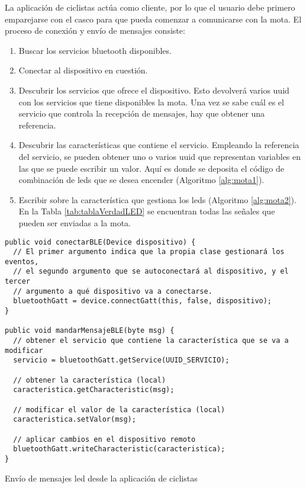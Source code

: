 La aplicación de ciclistas actúa como cliente, por lo que el usuario debe
primero emparejarse con el casco para que pueda comenzar a comunicarse con
la mota. El proceso de conexión y envío de mensajes consiste:
\begin{enumerate}
	\item Buscar los servicios bluetooth disponibles.

	\item Conectar al dispositivo en cuestión.

	\item Descubrir los servicios que ofrece el dispositivo. Esto devolverá
	varios \gls{uuid} con los servicios que tiene disponibles la mota. Una vez
	se sabe cuál es el servicio que controla la recepción de mensajes, hay que
	obtener	una referencia.

	\item Descubrir las características que contiene el servicio. Empleando la
	referencia del servicio, se pueden obtener uno o varios \gls{uuid} que
	representan variables en las que se puede escribir un valor. Aquí es donde
	se deposita	el código de combinación de leds que se desea encender
	(Algoritmo \ref{alg:mota1}).

	\item Escribir sobre la característica que gestiona los leds (Algoritmo
	\ref{alg:mota2}). En la Tabla	\ref{tab:tablaVerdadLED} se encuentran todas
	las señales que pueden ser enviadas a la mota.
\end{enumerate}

\begin{listing}
\begin{minipage}{.4\textwidth}
\begin{verbatim}
public void conectarBLE(Device dispositivo) {
  // El primer argumento indica que la propia clase gestionará los eventos,
  // el segundo argumento que se autoconectará al dispositivo, y el tercer
  // argumento a qué dispositivo va a conectarse.
  bluetoothGatt = device.connectGatt(this, false, dispositivo);
}

public void mandarMensajeBLE(byte msg) {
  // obtener el servicio que contiene la característica que se va a modificar
  servicio = bluetoothGatt.getService(UUID_SERVICIO);

  // obtener la característica (local)
  caracteristica.getCharacteristic(msg);

  // modificar el valor de la característica (local)
  caracteristica.setValor(msg);

  // aplicar cambios en el dispositivo remoto
  bluetoothGatt.writeCharacteristic(caracteristica);
}
\end{verbatim}
\end{minipage}
\caption{Envío de mensajes led desde la aplicación de ciclistas}
\label{alg:appciclistasBLE}
\end{listing}

